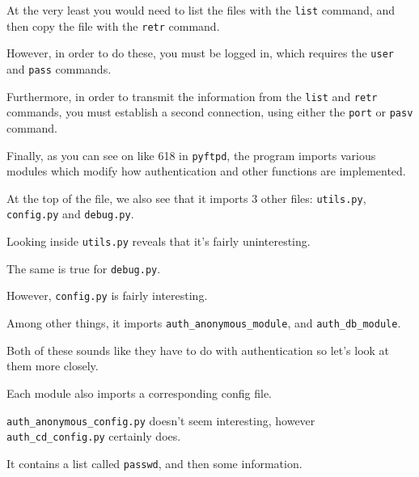 {{{                    At the very least you would need to list the files with the \lstinline`list` command, and then copy the file with the \lstinline`retr` command. %



However, in order to do these, you must be logged in, which requires the \lstinline`user` and \lstinline`pass` commands. %



Furthermore, in order to transmit the information from the \lstinline`list` and \lstinline`retr` commands, you must establish a second connection, using either the \lstinline`port` or \lstinline`pasv` command. 







                    Finally, as you can see on like 618 in \lstinline`pyftpd`, the program imports various modules which modify how authentication and other functions are implemented. %



At the top of the file, we also see that it imports 3 other files: \lstinline`utils.py`, \lstinline`config.py` and \lstinline`debug.py`. %



Looking inside \lstinline`utils.py` reveals that it's fairly uninteresting. %



The same is true for \lstinline`debug.py`. %



However, \lstinline`config.py` is fairly interesting. %



Among other things, it imports \lstinline`auth_anonymous_module`, and \lstinline`auth_db_module`. 







                    Both of these sounds like they have to do with authentication so let's look at them more closely. %



Each module also imports a corresponding config file. %



\lstinline`auth_anonymous_config.py` doesn't seem interesting, however \lstinline`auth_cd_config.py` certainly does. %



It contains a list called \lstinline`passwd`, and then some information. 







}}}
